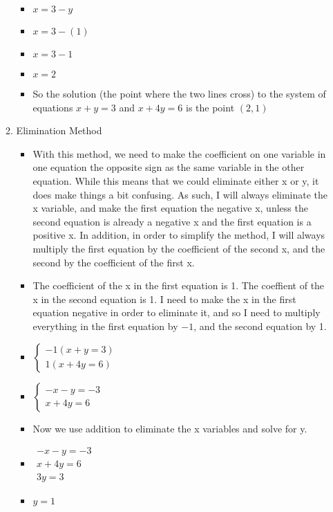 \documentclass{article}
\begin{document}
\begin{enumerate}
\begin{enumerate}
\begin{itemize}
    \item [] $x=3-y$
    \item [] $x=3-(1)$
    \item [] $x=3-1$
    \item [] $x=2$
    \item So the solution (the point where the two lines cross) to the system of equations $x+y=3$ and $x+4y=6$ is the point $(2,1)$
    \end{itemize}
  \item Elimination Method
    \begin{itemize}
    \item With this method, we need to make the coefficient on one variable in one equation the opposite sign as the same variable in the other equation. While this means that we could eliminate either x or y, it does make things a bit confusing. As such, I will always eliminate the x variable, and make the first equation the negative x, unless the second equation is already a negative x and the first equation is a positive x. In addition, in order to simplify the method, I will always multiply the first equation by the coefficient of the second x, and the second by the coefficient of the first x.
    \item The coefficient of the x in the first equation is 1. The coeffient of the x in the second equation is 1. I need to make the x in the first equation negative in order to eliminate it, and so I need to multiply everything in the first equation by $-1$, and the second equation by 1.
    \item []  $\left\{ \begin{array}{l}
              -1(x+y =3) \\
              1(x+4y=6) \end{array} \right.$
    \item []  $\left\{ \begin{array}{l}
              -x-y=-3 \\
              x+4y=6 \end{array} \right.$
    \item Now we use addition to eliminate the x variables and solve for y.
    \item []  $\begin{array}{l}
              -x-y=-3 \\
              x+4y=6 \\ \hline
              3y=3 \end{array}$
    \item [] $y=1$

\end{itemize}
\end{enumerate}
\end{enumerate}
\end{document}
